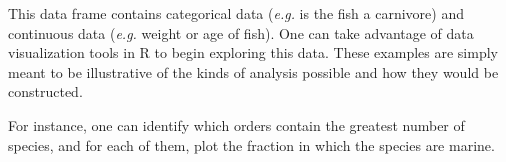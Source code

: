 \begin{Shaded}
\begin{Highlighting}[]
\NormalTok{(}\NormalTok{, }
\NormalTok{(}\NormalTok{, }
\NormalTok{)}
\NormalTok{)}
\end{Highlighting}
\end{Shaded}
This data frame contains categorical data (\emph{e.g.} is the fish a
carnivore) and continuous data (\emph{e.g.} weight or age of fish). One
can take advantage of data visualization tools in R to begin exploring
this data. These examples are simply meant to be illustrative of the
kinds of analysis possible and how they would be constructed.

For instance, one can identify which orders contain the greatest number
of species, and for each of them, plot the fraction in which the species
are marine.

